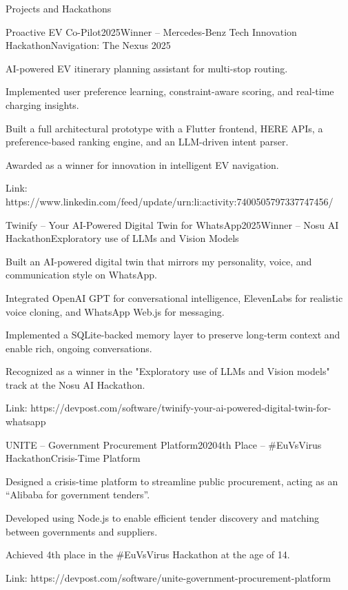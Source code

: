 \documentclass{resume} %
\begin{document}
\begin{rSection}{Projects and Hackathons}

\begin{rSubsection}{Proactive EV Co-Pilot}{2025}{Winner -- Mercedes-Benz Tech Innovation Hackathon}{Navigation: The Nexus 2025}
\item AI-powered EV itinerary planning assistant for multi-stop routing.
\item Implemented user preference learning, constraint-aware scoring, and real-time charging insights.
\item Built a full architectural prototype with a Flutter frontend, HERE APIs, a preference-based ranking engine, and an LLM-driven intent parser.
\item Awarded as a winner for innovation in intelligent EV navigation. 
\item Link: https://www.linkedin.com/feed/update/urn:li:activity:7400505797337747456/
\end{rSubsection}

\begin{rSubsection}{Twinify -- Your AI-Powered Digital Twin for WhatsApp}{2025}{Winner -- Nosu AI Hackathon}{Exploratory use of LLMs and Vision Models}
\item Built an AI-powered digital twin that mirrors my personality, voice, and communication style on WhatsApp.
\item Integrated OpenAI GPT for conversational intelligence, ElevenLabs for realistic voice cloning, and WhatsApp Web.js for messaging.
\item Implemented a SQLite-backed memory layer to preserve long-term context and enable rich, ongoing conversations.
\item Recognized as a winner in the "Exploratory use of LLMs and Vision models" track at the Nosu AI Hackathon.
\item Link: https://devpost.com/software/twinify-your-ai-powered-digital-twin-for-whatsapp
\end{rSubsection}

\begin{rSubsection}{UNITE -- Government Procurement Platform}{2020}{4th Place -- \#EuVsVirus Hackathon}{Crisis-Time Platform}
\item Designed a crisis-time platform to streamline public procurement, acting as an ``Alibaba for government tenders''.
\item Developed using Node.js to enable efficient tender discovery and matching between governments and suppliers.
\item Achieved 4th place in the \#EuVsVirus Hackathon at the age of 14.
\item Link: https://devpost.com/software/unite-government-procurement-platform
\end{rSubsection}


\end{rSection}
\end{document}
